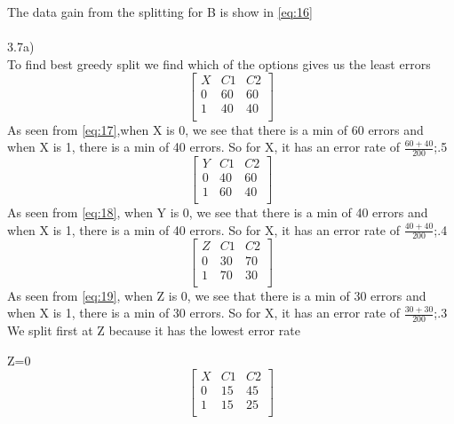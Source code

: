 \documentclass[12pt,english]{article}
\begin{document}
The data gain from the splitting for B is show in \eqref{eq:16}\\ \\
3.7a)\\
To find best greedy split we find which of the options gives us the least errors
\begin{equation*}\tag{1}\label{eq:17}
\begin{bmatrix} X & C1 & C2 \\0 & 60 &  60 \\1 & 40 &  40 \\ \end{bmatrix}
\end{equation*}
As seen from \eqref{eq:17},when X is 0, we see that there is a min of 60 errors and when X is 1, there is a min of 40 errors. So for X, it has an error rate of $\frac{60+40}{200}$;.5\\
\begin{equation*}\tag{2}\label{eq:18}
\begin{bmatrix} Y & C1 & C2 \\0 & 40 &  60 \\1 & 60 &  40 \\ \end{bmatrix}
\end{equation*}
As seen from \eqref{eq:18}, when Y is 0, we see that there is a min of 40 errors and when X is 1, there is a min of 40 errors. So for X, it has an error rate of $\frac{40+40}{200}$;.4\\
\begin{equation*}\tag{3}\label{eq:19}
\begin{bmatrix} Z & C1 & C2 \\0 & 30 &  70 \\1 & 70 &  30 \\ \end{bmatrix}
\end{equation*}
As seen from \eqref{eq:19}, when Z is 0, we see that there is a min of 30 errors and when X is 1, there is a min of 30 errors. So for X, it has an error rate of $\frac{30+30}{200}$;.3\\
We split first at Z because it has the lowest error rate\par
Z=0\\
\begin{equation*}\tag{1}\label{eq:20}
\begin{bmatrix} X & C1 & C2 \\0 & 15 &  45 \\1 & 15 &  25 \\ \end{bmatrix}
\end{equation*}
\end{document}
